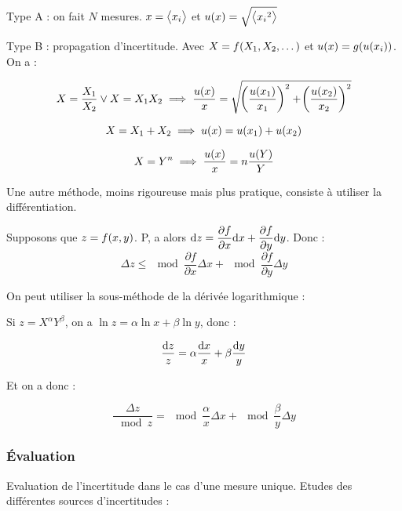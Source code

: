 \documentclass[a4paper,french,bookmarks]{book}
\begin{document}
    \begin{enumerate}
        \itt Type A : on fait $N$ mesures. $x = \big\langle x_i\big\rangle$ et $u\!\left(x\right) = \sqrt{\big\langle{x_i}^2\big\rangle}$
        
        \itt Type B : propagation d'incertitude. Avec $X = f\!\left(X_1, X_2, \dots\right)$ et $u\!\left(x\right) = g\!\left(u\!\left(x_i\right)\right)$. On a :
        
        \[ X = \dfrac{X_1}{X_2} \lor X = X_1X_2\implies \dfrac{u\!\left(x\right)}{x} = \sqrt{\!\left(\dfrac{u\!\left(x_1\right)}{x_1}\right)^2 + \!\left(\dfrac{u\!\left(x_2\right)}{x_2}\right)^2}\]
        
        \[ X = X_1 + X_2 \implies u\!\left(x\right) = u\!\left(x_1\right) + u\!\left(x_2\right)\]
        
        \[ X = Y^n \implies \dfrac{u\!\left(x\right)}{x} = n\dfrac{u\!\left(Y\right)}{Y}\]
        
        \itt Une autre méthode, moins rigoureuse mais plus pratique, consiste à utiliser la différentiation.
    
        Supposons que $z = f\!\left(x, y\right)$. P, a alors $\mathrm d z = \dfrac{\partial f}{\partial x}\mathrm d x + \dfrac{\partial f}{\partial y}\mathrm d y$. Donc :
        \[ \Delta z \leq \mod{\dfrac{\partial f}{\partial x}}\Delta x + \mod{\dfrac{\partial f}{\partial y}}\Delta y\]
        
        \itt On peut utiliser la sous-méthode de la dérivée logarithmique :
        
        Si $z = X^\alpha Y^\beta$, on a $\ln{z} = \alpha\ln{x} + \beta\ln{y}$, donc :
        
        \[ \dfrac{\mathrm d z}{z} = \alpha \dfrac{\mathrm d x}{x} + \beta \dfrac{\mathrm d y}{y} \]
        
        Et on a donc :
        
        \[ \dfrac{\Delta z}{\mod{z}} = \mod{\dfrac{\alpha}{x}}\Delta x + \mod{\dfrac{\beta}{y}}\Delta y\]
    \end{enumerate}
    
    \subsubsection{Évaluation}
    
    Evaluation de l'incertitude dans le cas d'une mesure unique. Etudes des différentes sources d'incertitudes :
    
\end{document}
